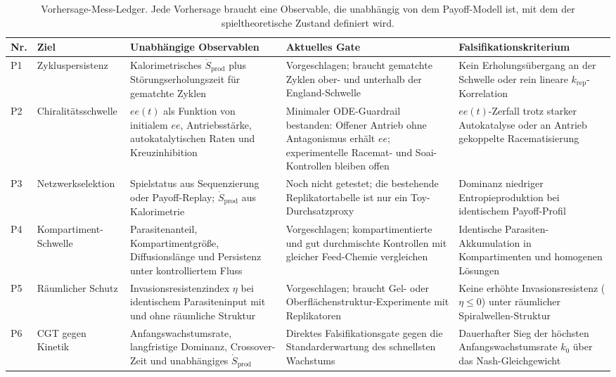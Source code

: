 \documentclass[12pt,a4paper]{article}
\theoremstyle{remark}
\begin{document}
\begin{table}[htbp]
\centering
\caption{Vorhersage-Mess-Ledger. Jede Vorhersage braucht eine Observable, die unabhängig von dem Payoff-Modell ist, mit dem der spieltheoretische Zustand definiert wird.}
\label{tab:prediction-ledger}
\scriptsize
\setlength{\tabcolsep}{2pt}
\begin{tabularx}{\textwidth}{@{}>{\raggedright\arraybackslash}p{}>{\raggedright\arraybackslash}p{}>{\raggedright\arraybackslash}p{}>{\raggedright\arraybackslash}p{}>{\raggedright\arraybackslash}X@{}}
\toprule
\textbf{Nr.} & \textbf{Ziel} & \textbf{Unabhängige Observablen} & \textbf{Aktuelles Gate} & \textbf{Falsifikationskriterium} \\
\midrule
P1 & Zyklus\-persistenz & Kalorimetrisches $\dot{S}_{\mathrm{prod}}$ plus Störungserholungszeit für gematchte Zyklen & Vorgeschlagen; braucht gematchte Zyklen ober- und unterhalb der England-Schwelle & Kein Erholungsübergang an der Schwelle oder rein lineare $k_{\mathrm{rep}}$-Korrelation \\
P2 & Chiralitäts\-schwelle & $ee(t)$ als Funktion von initialem $ee$, Antriebsstärke, autokatalytischen Raten und Kreuzinhibition & Minimaler ODE-Guardrail bestanden: Offener Antrieb ohne Antagonismus erhält $ee$; experimentelle Racemat- und Soai-Kontrollen bleiben offen & $ee(t)$-Zerfall trotz starker Autokatalyse oder an Antrieb gekoppelte Racematisierung \\
P3 & Netzwerk\-selektion & Spielstatus aus Sequenzierung oder Payoff-Replay; $\dot{S}_{\mathrm{prod}}$ aus Kalorimetrie & Noch nicht getestet; die bestehende Replikatortabelle ist nur ein Toy-Durchsatzproxy & Dominanz niedriger Entropieproduktion bei identischem Payoff-Profil \\
P4 & Kompartiment-Schwelle & Parasitenanteil, Kompartimentgröße, Diffusionslänge und Persistenz unter kontrolliertem Fluss & Vorgeschlagen; kompartimentierte und gut durchmischte Kontrollen mit gleicher Feed-Chemie vergleichen & Identische Parasiten-Akkumulation in Kompartimenten und homogenen Lösungen \\
P5 & Räumlicher Schutz & Invasionsresistenzindex $\eta$ bei identischem Parasiteninput mit und ohne räumliche Struktur & Vorgeschlagen; braucht Gel- oder Oberflächenstruktur-Experimente mit Replikatoren & Keine erhöhte Invasionsresistenz ($\eta \le 0$) unter räumlicher Spiralwellen-Struktur \\
P6 & CGT gegen Kinetik & Anfangswachstumsrate, langfristige Dominanz, Crossover-Zeit und unabhängiges $\dot{S}_{\mathrm{prod}}$ & Direktes Falsifikationsgate gegen die Standarderwartung des schnellsten Wachstums & Dauerhafter Sieg der höchsten Anfangswachstumsrate $k_0$ über das Nash-Gleichgewicht \\
\bottomrule
\end{tabularx}
\end{table}
\end{document}
